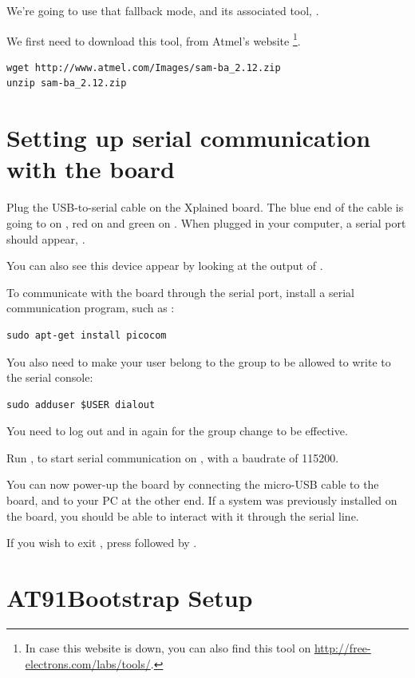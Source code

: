 We're going to use that fallback mode, and its associated tool,
.

We first need to download this tool, from Atmel's website
\footnote{In case this website is down, you can also find this
tool on \url{http://free-electrons.com/labs/tools/}.}.

\begin{verbatim}
wget http://www.atmel.com/Images/sam-ba_2.12.zip
unzip sam-ba_2.12.zip
\end{verbatim}

\section{Setting up serial communication with the board}

Plug the USB-to-serial cable on the Xplained board. The blue end of
the cable is going to  on , red on  and
green on . When plugged in your computer, a serial port
should appear, .

You can also see this device appear by looking at the output of
.

To communicate with the board through the serial port, install a
serial communication program, such as :

\begin{verbatim}
sudo apt-get install picocom
\end{verbatim}

You also need to make your user belong to the  group to be
allowed to write to the serial console:

\begin{verbatim}
sudo adduser $USER dialout
\end{verbatim}

You need to log out and in again for the group change to be effective.

Run , to start serial
communication on , with a baudrate of 115200.

You can now power-up the board by connecting the micro-USB cable to 
the board, and to your PC at the other end. If a system was previously
installed on the board, you should be able to interact with it
through the serial line.

If you wish to exit , press \code{[Ctrl][a]} followed by
\code{[Ctrl][x]}.

\section{AT91Bootstrap Setup}

